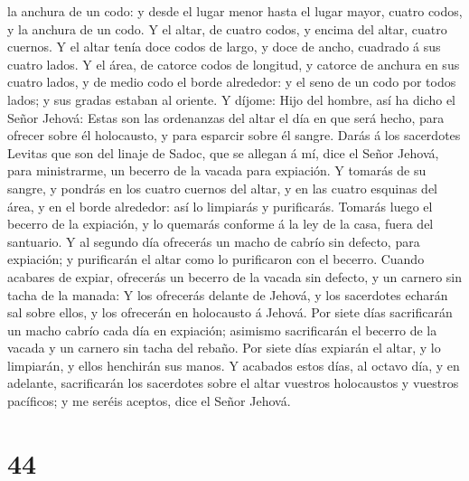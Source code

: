 la anchura de un codo: y desde el lugar menor hasta el lugar mayor,
cuatro codos, y la anchura de un codo.  Y el altar, de
cuatro codos, y encima del altar, cuatro cuernos.  Y el
altar tenía doce codos de largo, y doce de ancho, cuadrado á sus cuatro
lados.  Y el área, de catorce codos de longitud, y catorce
de anchura en sus cuatro lados, y de medio codo el borde alrededor: y el
seno de un codo por todos lados; y sus gradas estaban al oriente.
 Y díjome: Hijo del hombre, así ha dicho el Señor Jehová:
Estas son las ordenanzas del altar el día en que será hecho, para
ofrecer sobre él holocausto, y para esparcir sobre él sangre.
 Darás á los sacerdotes Levitas que son del linaje de
Sadoc, que se allegan á mí, dice el Señor Jehová, para ministrarme, un
becerro de la vacada para expiación.  Y tomarás de su
sangre, y pondrás en los cuatro cuernos del altar, y en las cuatro
esquinas del área, y en el borde alrededor: así lo limpiarás y
purificarás.  Tomarás luego el becerro de la expiación, y
lo quemarás conforme á la ley de la casa, fuera del santuario.
 Y al segundo día ofrecerás un macho de cabrío sin defecto,
para expiación; y purificarán el altar como lo purificaron con el
becerro.  Cuando acabares de expiar, ofrecerás un becerro
de la vacada sin defecto, y un carnero sin tacha de la manada:
 Y los ofrecerás delante de Jehová, y los sacerdotes
echarán sal sobre ellos, y los ofrecerán en holocausto á Jehová.
 Por siete días sacrificarán un macho cabrío cada día en
expiación; asimismo sacrificarán el becerro de la vacada y un carnero
sin tacha del rebaño.  Por siete días expiarán el altar, y
lo limpiarán, y ellos henchirán sus manos.  Y acabados
estos días, al octavo día, y en adelante, sacrificarán los sacerdotes
sobre el altar vuestros holocaustos y vuestros pacíficos; y me seréis
aceptos, dice el Señor Jehová.

\hypertarget{section-43}{%
\section{44}\label{section-43}}

